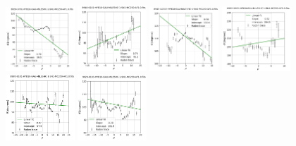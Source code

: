 \documentclass[fleqn,usenatbib]{mnras}
\begin{document}
\begin{figure}
    \centering
    \includegraphics[width=0.23\textwidth]{Images/LINFITS/CC0-8939-3701-LINFIT-EBARS-MASKED.png}
    \includegraphics[width=0.23\textwidth]{Images/LINFITS/CC0-8940-6101-LINFIT-EBARS-MASKED.png}
    \includegraphics[width=0.23\textwidth]{Images/LINFITS/CC0-8945-12703-LINFIT-EBARS-MASKED.png}
    \includegraphics[width=0.23\textwidth]{Images/LINFITS/CC0-8992-1902-LINFIT-EBARS-MASKED.png}
    \includegraphics[width=0.23\textwidth]{Images/LINFITS/CC0-8995-9101-LINFIT-EBARS-MASKED.png}
    \includegraphics[width=0.23\textwidth]{Images/LINFITS/CC0-9029-6103-LINFIT-EBARS-MASKED.png}

\end{figure}
\end{document}

